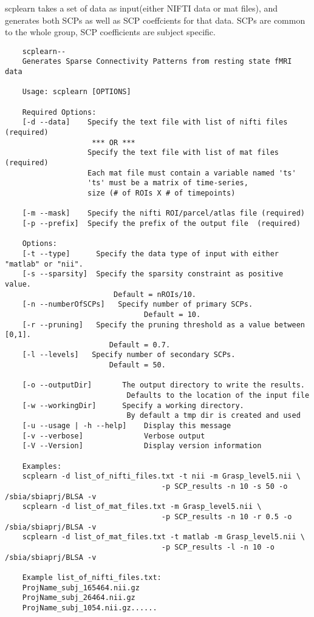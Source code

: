 \documentclass[12pt]{article}
\begin{document}
scplearn takes a set of data as input(either NIFTI data or mat files), and generates both SCPs as well as SCP coeffcients for that data. SCPs are common to the whole group, SCP coefficients are subject specific.
\begin{verbatim}
	scplearn--
    Generates Sparse Connectivity Patterns from resting state fMRI data

    Usage: scplearn [OPTIONS] 

    Required Options:
    [-d --data]    Specify the text file with list of nifti files (required) 
                    *** OR ***
                   Specify the text file with list of mat files (required) 
                   Each mat file must contain a variable named 'ts'
                   'ts' must be a matrix of time-series, 
                   size (# of ROIs X # of timepoints)
                    
    [-m --mask]    Specify the nifti ROI/parcel/atlas file (required)
    [-p --prefix]  Specify the prefix of the output file  (required)
    
    Options:
    [-t --type]   	 Specify the data type of input with either "matlab" or "nii".      
    [-s --sparsity]  Specify the sparsity constraint as positive value. 
    					 Default = nROIs/10. 
    [-n --numberOfSCPs]   Specify number of primary SCPs. 
    							Default = 10.    
    [-r --pruning]   Specify the pruning threshold as a value between [0,1]. 
    					Default = 0.7.    
    [-l --levels]   Specify number of secondary SCPs. 
    					Default = 50.

    [-o --outputDir]       The output directory to write the results. 
    						Defaults to the location of the input file
    [-w --workingDir]      Specify a working directory. 
    						By default a tmp dir is created and used
    [-u --usage | -h --help]    Display this message
    [-v --verbose]              Verbose output
    [-V --Version]              Display version information

    Examples:
    scplearn -d list_of_nifti_files.txt -t nii -m Grasp_level5.nii \
    								-p SCP_results -n 10 -s 50 -o /sbia/sbiaprj/BLSA -v
    scplearn -d list_of_mat_files.txt -m Grasp_level5.nii \
    								-p SCP_results -n 10 -r 0.5 -o /sbia/sbiaprj/BLSA -v
    scplearn -d list_of_mat_files.txt -t matlab -m Grasp_level5.nii \
    								-p SCP_results -l -n 10 -o /sbia/sbiaprj/BLSA -v
    
    Example list_of_nifti_files.txt:
    ProjName_subj_165464.nii.gz
    ProjName_subj_26464.nii.gz
    ProjName_subj_1054.nii.gz......      
\end{verbatim}
    
\end{document}
